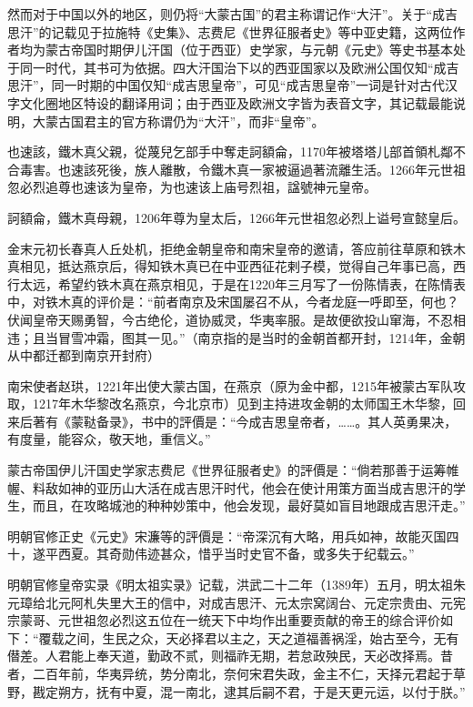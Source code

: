 然而对于中国以外的地区，则仍将“大蒙古国”的君主称谓记作“大汗”。关于“成吉思汗”的记载见于拉施特《史集》、志费尼《世界征服者史》等中亚史籍，这两位作者均为蒙古帝国时期伊儿汗国（位于西亚）史学家，与元朝《元史》等史书基本处于同一时代，其书可为依据。四大汗国治下以的西亚国家以及欧洲公国仅知“成吉思汗”，同一时期的中国仅知“成吉思皇帝”，可见“成吉思皇帝”一词是针对古代汉字文化圈地区特设的翻译用词；由于西亚及欧洲文字皆为表音文字，其记载最能说明，大蒙古国君主的官方称谓仍为“大汗”，而非“皇帝”。

也速該，鐵木真父親，從蔑兒乞部手中奪走訶額侖，1170年被塔塔儿部首領札鄰不合毒害。也速該死後，族人離散，令鐵木真一家被逼過著流離生活。1266年元世祖忽必烈追尊也速该为皇帝，为也速该上庙号烈祖，諡號神元皇帝。

訶額侖，鐵木真母親，1206年尊为皇太后，1266年元世祖忽必烈上谥号宣懿皇后。

金末元初长春真人丘处机，拒绝金朝皇帝和南宋皇帝的邀请，答应前往草原和铁木真相见，抵达燕京后，得知铁木真已在中亚西征花剌子模，觉得自己年事已高，西行太远，希望约铁木真在燕京相见，于是在1220年三月写了一份陈情表，在陈情表中，对铁木真的评价是：“前者南京及宋国屡召不从，今者龙庭一呼即至，何也？伏闻皇帝天赐勇智，今古绝伦，道协威灵，华夷率服。是故便欲投山窜海，不忍相违；且当冒雪冲霜，图其一见。”（南京指的是当时的金朝首都开封，1214年，金朝从中都迁都到南京开封府）

南宋使者赵珙，1221年出使大蒙古国，在燕京（原为金中都，1215年被蒙古军队攻取，1217年木华黎改名燕京，今北京市）见到主持进攻金朝的太师国王木华黎，回来后著有《蒙鞑备录》，书中的評價是：“今成吉思皇帝者，……。其人英勇果决，有度量，能容众，敬天地，重信义。”

蒙古帝国伊儿汗国史学家志费尼《世界征服者史》的評價是：“倘若那善于运筹帷幄、料敌如神的亚历山大活在成吉思汗时代，他会在使计用策方面当成吉思汗的学生，而且，在攻略城池的种种妙策中，他会发现，最好莫如盲目地跟成吉思汗走。”

明朝官修正史《元史》宋濂等的評價是：“帝深沉有大略，用兵如神，故能灭国四十，遂平西夏。其奇勋伟迹甚众，惜乎当时史官不备，或多失于纪载云。”

明朝官修皇帝实录《明太祖实录》记载，洪武二十二年（1389年）五月，明太祖朱元璋给北元阿札失里大王的信中，对成吉思汗、元太宗窝阔台、元定宗贵由、元宪宗蒙哥、元世祖忽必烈这五位在一统天下中均作出重要贡献的帝王的综合评价如下：“覆载之间，生民之众，天必择君以主之，天之道福善祸淫，始古至今，无有僣差。人君能上奉天道，勤政不贰，则福祚无期，若怠政殃民，天必改择焉。昔者，二百年前，华夷异统，势分南北，奈何宋君失政，金主不仁，天择元君起于草野，戡定朔方，抚有中夏，混一南北，逮其后嗣不君，于是天更元运，以付于朕。”

